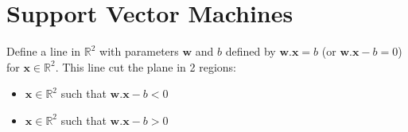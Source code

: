 \documentclass[]{article}
\newcommand{\R}{\mathbb{R}}
\begin{document}
	\section{Support Vector Machines}
	Define a line in $\R^2$ with parameters $\boldsymbol{w}$ and $b$ defined by $\boldsymbol{w}.\boldsymbol{x} = b$ (or $\boldsymbol{w}.\boldsymbol{x} - b = 0$) for $\boldsymbol{x} \in \R^2$.
	This line cut the plane in 2 regions:
	\begin{itemize}
		\item $\boldsymbol{x} \in \R^2$ such that $\boldsymbol{w}.\boldsymbol{x} - b < 0$
		\item $\boldsymbol{x} \in \R^2$ such that $\boldsymbol{w}.\boldsymbol{x} - b > 0$
	\end{itemize}
	
\end{document}
